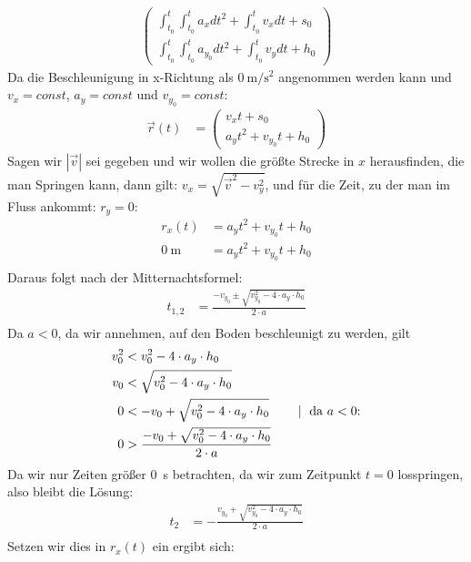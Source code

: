 \documentclass[sectionformat = aufgabe]{gadsescript}
\begin{document}
\begin{enumerate}[label=\alph*)]
\begin{align*}
\begin{pmatrix}
					\int_{t_0}^{t} \int_{t_0}^{t} a_x dt^2 + \int_{t_0}^{t} v_x dt + s_0\\
					\int_{t_0}^{t} \int_{t_0}^{t} a_{y_0} dt^2 + \int_{t_0}^{t} v_y dt + h_0
				\end{pmatrix}
		\end{align*}
		Da die Beschleunigung in x-Richtung als $\qty{0}{\metre\per\square\second}$ angenommen werden kann und $v_x = const $, $ a_y = const $ und $ v_{y_0} = const$:
		\begin{align*}
			\vec r(t)&= \begin{pmatrix}
					v_xt + s_0\\
					a_yt^2 + v_{y_0}t + h_0
				\end{pmatrix}
		\end{align*}
		Sagen wir $ | \vec v | $ sei gegeben und wir wollen die größte Strecke in $ x $ herausfinden, die man Springen kann, dann gilt: $ v_x = \sqrt{ \vec v^2 - v_y^2 } $, und für die Zeit, zu der man im Fluss ankommt: $ r_y = 0 $:
		\begin{align*}
			r_x(t) &= a_yt^2 + v_{y_0}t + h_0\\
			\qty{0}{\metre} &= a_y t^2 + v_{y_0}t + h_0\\
		\end{align*}
		Daraus folgt nach der Mitternachtsformel:
		\begin{align*}
			t_{1,2} &= \frac{-v_{y_0} \pm \sqrt{v_{y_0}^2 - 4\cdot a_y\cdot h_0}}{2\cdot a}\\
		\end{align*}
		Da $ a < 0 $, da wir annehmen, auf den Boden beschleunigt zu werden, gilt
		\begin{align*}
			v_0^2 &< v_0^2 - 4 \cdot a_y \cdot h_0\\
			v_0 &< \sqrt{v_0^2 - 4 \cdot a_y \cdot h_0}\\
			0 &< - v_0 + \sqrt{ v_0^2 - 4 \cdot a_y \cdot h_0} \qquad \mid \text{ da $ a < 0 $:}\\
			0 &> \frac{ - v_0 + \sqrt{ v_0^2 - 4 \cdot a_y \cdot h_0}}{2\cdot a}\\
		\end{align*}
		Da wir nur Zeiten größer \qty{0}{\second} betrachten, da wir zum Zeitpunkt $ t = 0 $ losspringen, also bleibt die Lösung:
		\begin{align*}
			t_{2} &= - \frac{v_{y_0} + \sqrt{v_{y_0}^2 - 4\cdot a_y\cdot h_0}}{2\cdot a}\\
		\end{align*}
		Setzen wir dies in $ r_x(t) $ ein ergibt sich:


\end{enumerate}
\end{document}

